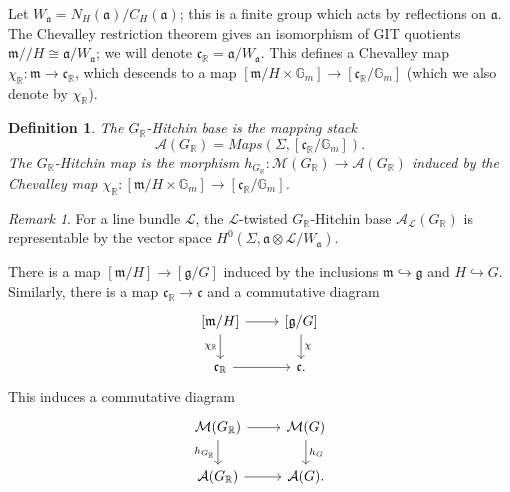 \documentclass{amsart}
\newtheorem{definition}[theorem]{Definition}
\theoremstyle{remark}
\newtheorem{remark}[theorem]{Remark}
\numberwithin{theorem}{section}
\numberwithin{equation}{section}
\begin{document}
Let $W_{\mathfrak{a}} = N_H(\mathfrak{a})/C_H(\mathfrak{a})$; this is a finite group which acts by reflections on $\mathfrak{a}$. The Chevalley restriction theorem gives an isomorphism of GIT quotients $\mathfrak{m}//H \cong \mathfrak{a}/W_{\mathfrak{a}}$; we will denote $\mathfrak{c}_\mathbb{R} = \mathfrak{a}/W_{\mathfrak{a}}$. This defines a Chevalley map $\chi_\mathbb{R}:\mathfrak{m} \rightarrow \mathfrak{c}_\mathbb{R}$, which descends to a map $[\mathfrak{m}/H \times\mathbb{G}_m]\rightarrow [\mathfrak{c}_\mathbb{R}/\mathbb{G}_m]$ (which we also denote by $\chi_\mathbb{R}$).

\begin{definition}\label{RealHitchinmapdef}
   The \emph{$G_{\mathbb{R}}$-Hitchin base} is the mapping stack
   \begin{equation}\label{RealHitchinBasedef}
    \mathcal A(G_{\mathbb{R}})=Maps(\Sigma,[\mathfrak{c}_\mathbb{R}/\mathbb{G}_m]).
    \end{equation}
    The \emph{$G_\mathbb{R}$-Hitchin map} is the morphism $h_{G_\mathbb{R}}:\mathcal M(G_\mathbb{R}) \rightarrow \mathcal A(G_\mathbb{R})$ induced by the Chevalley map $\chi_\mathbb{R}:[\mathfrak{m}/H \times\mathbb{G}_m]\rightarrow [\mathfrak{c}_\mathbb{R}/\mathbb{G}_m]$.
\end{definition}

\begin{remark}\label{RealHitchinBasermk}
    For a line bundle $\mathcal L$, the $\mathcal L$-twisted $G_\mathbb{R}$-Hitchin base $\mathcal A_\mathcal L(G_\mathbb{R})$ is representable by the vector space $H^0(\Sigma,\mathfrak{a}\otimes\mathcal L/W_\mathfrak{a})$. 
\end{remark}

 There is a map $[\mathfrak{m}/H] \rightarrow [\mathfrak{g}/G]$ induced by the inclusions $\mathfrak{m} \hookrightarrow \mathfrak{g}$ and $H \hookrightarrow G$. Similarly, there is a map $\mathfrak{c}_\mathbb{R} \rightarrow \mathfrak{c}$ and a commutative diagram
\begin{equation}\label{RealtoComplexCheveqn}
\begin{tikzcd}
{[\mathfrak{m}/H]} \arrow[r] \arrow[d, "\chi_{\mathbb{R}}"'] & {[\mathfrak{g}/G]} \arrow[d, "\chi"] \\
\mathfrak{c}_\mathbb{R} \arrow[r]                      & \mathfrak{c}.                      
\end{tikzcd}
\end{equation}
This induces a commutative diagram
\begin{equation}\label{RealtoComplexHitchineqn}
\begin{tikzcd}
{\mathcal M(G_{\mathbb{R}})} \arrow[r] \arrow[d, "h_{G_{\mathbb{R}}}"'] & {\mathcal M(G)} \arrow[d, "h_G"] \\
{\mathcal A( G_{\mathbb{R}})} \arrow[r]                             & {\mathcal A(G)}.              
\end{tikzcd}
\end{equation}
\end{document}
